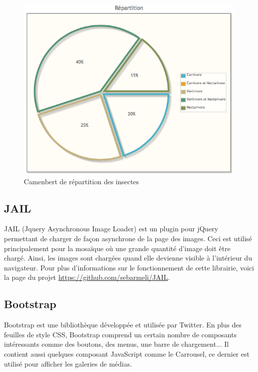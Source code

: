 \documentclass[twoside]{EPURapport}
\begin{document}
		\begin{figure}[hbtp]
			\centering
			\includegraphics[scale=0.5]{images/lib-jqplot.png}
			\caption{Camenbert de répartition des insectes}
		\end{figure}
		
		\subsection{JAIL}
		\label{lib:jail}
		JAIL (Jquery Asynchronous Image Loader) est un plugin pour jQuery permettant de charger de façon asynchrone de la page des images. Ceci est utilisé principalement pour la mosaïque où une grande quantité d'image doit être chargé. Ainsi, les images sont chargées quand elle devienne visible à l'intérieur du navigateur. Pour plus d'informations sur le fonctionnement de cette librairie, voici la page du projet \url{https://github.com/sebarmeli/JAIL}.
		
		\subsection{Bootstrap}
		\label{lib:bootstrap}
		Bootstrap est une bibliothèque développée et utilisée par Twitter. En plus des feuilles de style CSS, Bootstrap comprend un certain nombre de composants intéressants comme des boutons, des menus, une barre de chargement... Il contient aussi quelques composant JavaScript comme le Carrousel, ce dernier est utilisé pour  afficher les galeries de médias.\\
		
\end{document}
